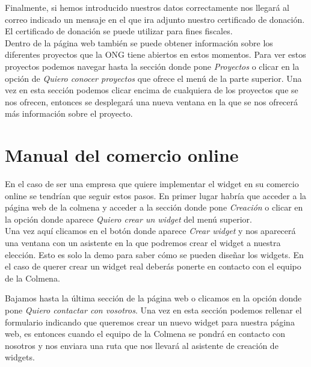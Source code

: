 
Finalmente, si hemos introducido nuestros datos correctamente nos llegará al correo indicado un mensaje en el que ira adjunto nuestro certificado de donación. El certificado de donación se puede utilizar para fines fiscales.\\

Dentro de la página web también se puede obtener información sobre los diferentes proyectos que la ONG tiene abiertos en estos momentos. Para ver estos proyectos podemos navegar hasta la sección donde pone \textit{Proyectos} o clicar en la opción de \textit{Quiero conocer proyectos} que ofrece el menú de la parte superior. Una vez en esta sección podemos clicar encima de cualquiera de los proyectos que se nos ofrecen, entonces se desplegará una nueva ventana en la que se nos ofrecerá más información sobre el proyecto.


\section{Manual del comercio online}
En el caso de ser una empresa que quiere implementar el widget en su comercio online se tendrían que seguir estos pasos. En primer lugar habría que acceder a la página web de la colmena y acceder a la sección donde pone \textit{Creación} o clicar en la opción donde aparece \textit{Quiero crear un widget} del menú superior.\\

Una vez aquí clicamos en el botón donde aparece \textit{Crear widget} y nos aparecerá una ventana con un asistente en la que podremos crear el widget a nuestra elección. Esto es solo la demo para saber cómo se pueden diseñar los widgets. En el caso de querer crear un widget real deberás ponerte en contacto con el equipo de la Colmena.\\


Bajamos hasta la última sección de la página web o clicamos en la opción donde pone \textit{Quiero contactar con vosotros}. Una vez en esta sección podemos rellenar el formulario indicando que queremos crear un nuevo widget para nuestra página web, es entonces cuando el equipo de la Colmena se pondrá en contacto con nosotros y nos enviara una ruta que nos llevará al asistente de creación de widgets.\\

